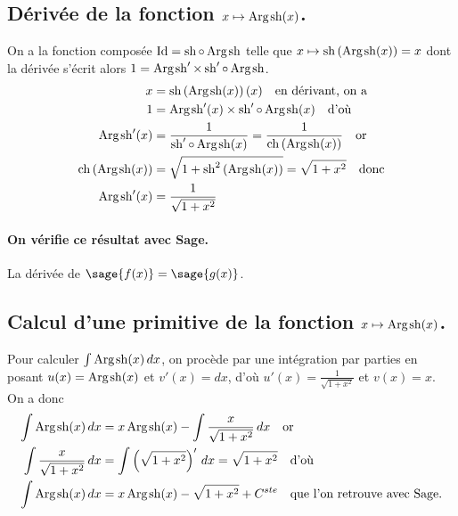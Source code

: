 \documentclass[a4paper,12pt]{report}
\def\Id{\ensuremath{\mathrm{Id}}}
\renewcommand{\sinh}{\mathop{\mathrm{sh}}}
\renewcommand{\cosh}{\mathop{\mathrm{ch}}}
\renewcommand{\arg}{\mathop{\mathrm{Arg}}}
\begin{document}
\subsection{Dérivée de la fonction $x \mapsto \arg\mspace{-1mu}\sinh(x)$.\label{argsinh}}
On a la fonction composée $\Id = \sinh \circ \arg\mspace{-1mu}\sinh$ telle que $x\mapsto\sinh\left(\arg\mspace{-1mu}\sinh(x)\right)=x$ dont la dérivée s'écrit alors $1= \arg\mspace{-1mu}\sinh\nolimits' \times \sinh\nolimits'\circ\arg\mspace{-1mu}\sinh$.
\begin{align*}
x & =\sinh\left(\arg\mspace{-1mu}\sinh(x)\right)(x) \quad \textrm{en dérivant, on a}\\
1 & = \arg\mspace{-1mu}\sinh\nolimits'(x) \times \sinh\nolimits'\circ\arg\mspace{-1mu}\sinh(x) \quad \textrm{d'où}\\
\arg\mspace{-1mu}\sinh\nolimits'(x) & =\frac{1}{ \sinh\nolimits'\circ\arg\mspace{-1mu}\sinh(x)}=\frac{1}{ \cosh\left(\arg\mspace{-1mu}\sinh(x)\right)}\quad \textrm{or}\\
\cosh\left(\arg\mspace{-1mu}\sinh(x)\right) & = \sqrt{1+\sinh\nolimits^2\left(\arg\mspace{-1mu}\sinh(x)\right)}=\sqrt{1+x^2}\quad \textrm{donc}\\
\arg\mspace{-1mu}\sinh\nolimits'(x) & = \frac{1}{ \sqrt{1+x^2}}
\end{align*}


\paragraph{On vérifie ce résultat avec Sage.}
La dérivée de $\sage{f(x)} = \sage{g(x)} $.


\subsection{Calcul d'une primitive de la fonction  $x \mapsto \arg\mspace{-1mu}\sinh(x)$.}
Pour calculer $\int \arg\mspace{-1mu}\sinh(x) \, dx$, on procède par une intégration par parties en posant $u(x) = \arg\mspace{-1mu}\sinh(x)$ et $v'(x) = dx$, d'où $u'(x) = \frac{1}{ \sqrt{1+x^2}}$ et $ v(x) = x $. \\
On a donc
\begin{align*}
\int \arg\mspace{-1mu}\sinh(x) \, dx & = x \arg\mspace{-1mu}\sinh(x) - \int \frac{x}{ \sqrt{1+x^2}} \, dx \quad \textrm{or}\\
\int \frac{x}{ \sqrt{1+x^2}} \, dx & = \int \left(\sqrt{1+x^2}\right)' \, dx = \sqrt{1+x^2}  \quad \textrm{d'où}\\
\int \arg\mspace{-1mu}\sinh(x) \, dx & = x \arg\mspace{-1mu}\sinh(x) - \sqrt{1+x^2} + C^{ste} \quad \textrm{que l'on retrouve avec Sage.}
\end{align*}
\end{document}
